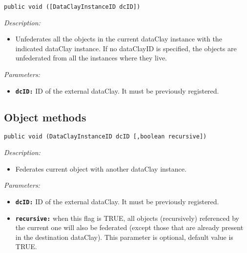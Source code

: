\begin{dBox}

\texttt{public void ([DataClayInstanceID dcID])}
\LINE

{\it Description:}

\begin{itemize}
  \item Unfederates all the objects in the current dataClay instance with the indicated dataClay instance. If no dataClayID is specified, the objects are unfederated from all the instances where they live.
\end{itemize}

{\it Parameters:}

\begin{itemize}
  \item \texttt{\bfseries dcID:} ID of the external dataClay. It must be previously registered.
\end{itemize}

\end{dBox}

\subsection{Object methods}
\label{sec:JavaFederationObject}

\begin{dBox}
\texttt{public void (DataClayInstanceID dcID [,boolean recursive])}
\LINE

{\it Description:}

\begin{itemize}
  \item Federates current object with another dataClay instance. 
\end{itemize}

{\it Parameters:}

\begin{itemize}
  \item \texttt{\bfseries dcID:} ID of the external dataClay. It must be previously registered.
  \item \texttt{\bfseries recursive:} when this flag is TRUE, all objects (recursively) referenced by the current one will also be federated (except those that are already present in the destination dataClay). This parameter is optional, default value is TRUE.
\end{itemize}

\end{dBox}


